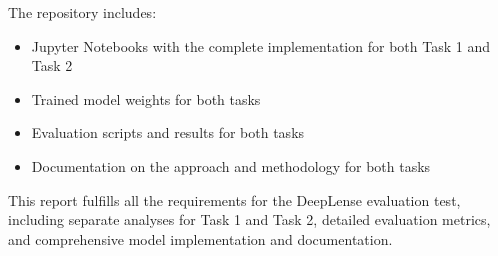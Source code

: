 \documentclass[11pt,a4paper]{article}
\begin{document}
The repository includes:
\begin{itemize}
    \item Jupyter Notebooks with the complete implementation for both Task 1 and Task 2
    \item Trained model weights for both tasks
    \item Evaluation scripts and results for both tasks
    \item Documentation on the approach and methodology for both tasks
\end{itemize}

This report fulfills all the requirements for the DeepLense evaluation test, including separate analyses for Task 1 and Task 2, detailed evaluation metrics, and comprehensive model implementation and documentation.
\end{document}

